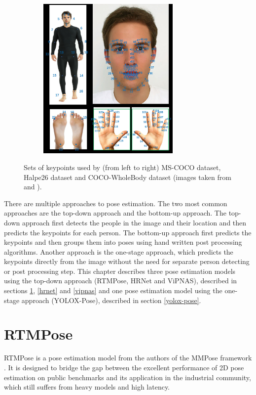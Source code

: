 \begin{figure}[htb]
\begin{subfigure}[b]{0.5\textwidth}
        \includegraphics[height=8cm]{obrazky-figures/coco_wholebody_landmarks.jpg}
        \label{fig:image3}
    \end{subfigure}

    \caption{Sets of keypoints used by (from left to right) MS-COCO dataset, Halpe26 dataset and COCO-WholeBody dataset (images taken from \cite{coco} and \cite{halpe}).}
    \label{fig:subfigures}
\end{figure}

There are multiple approaches to pose estimation. The two most common approaches are the top-down approach and the bottom-up approach. The top-down approach first detects the people in the image and their location and then predicts the keypoints for each person. The bottom-up approach first predicts the keypoints and then groups them into poses using hand written post processing algorithms. Another approach is the one-stage approach, which predicts the keypoints directly from the image without the need for separate person detecting or post processing step. This chapter describes three pose estimation models using the top-down approach (RTMPose, HRNet and ViPNAS), described in sections \ref{rtmpose}, \ref{hrnet} and \ref{vipnas} and one pose estimation model using the one-stage approach (YOLOX-Pose), described in section \ref{yolox-pose}.






\section{RTMPose}
\label{rtmpose}

RTMPose \cite{rtmpose} is a pose estimation model from the authors of the MMPose framework \cite{mmpose2020}. It is designed to bridge the gap between the excellent performance of 2D pose estimation on public benchmarks and its application in the industrial community, which still suffers from heavy models and high latency.

